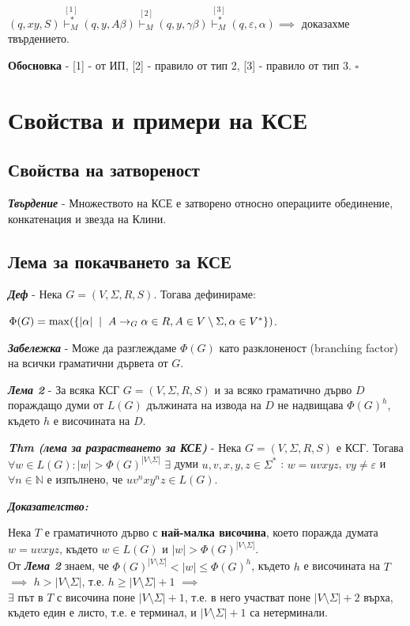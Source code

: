 \documentclass[fleqn,12pt]{article}
\DeclareMathOperator{\mmax}{max}
\begin{document}
\begin{flushleft}
$(q, xy, S) \overset{[1]}{\vdash_M^*} (q, y, A\beta) \overset{[2]}{\vdash_M} (q, y, \gamma\beta) \overset{[3]}{\vdash_M^*} (q, \varepsilon, \alpha) \implies$ доказахме твърдението.

\textbf{Обосновка} - [1] - от ИП, [2] - правило от тип 2, [3] - правило от тип 3. $\square$

\section{Свойства и примери на КСЕ}

\subsection{Свойства на затвореност}

\textit{\textbf{Твърдение}} - Множеството на КСЕ е затворено относно операциите обединение, конкатенация и звезда на Клини.

\subsection{Лема за покачването за КСЕ}

\textit{\textbf{Деф}} - Нека $G = (V, \Sigma, R, S)$. Тогава дефинираме: 

$\Phi(G) = \mmax(\{|\alpha| \hspace{2mm} | \hspace{2mm} A \to_G \alpha \in R, A \in V \setminus \Sigma, \alpha \in V^*\})$.

\textit{\textbf{Забележка}} - Може да разглеждаме $\Phi(G)$ като разклоненост (branching factor) на всички граматични дървета от $G$.

\textit{\textbf{Лема 2}} - За всяка КСГ $G = (V, \Sigma, R, S)$ и за всяко граматично дърво $D$ пораждащо думи от $L(G)$ дължината на извода на $D$ не надвищава $\Phi(G)^h$, където $h$ е височината на $D$.

\textit{\textbf{Thm (лема за разрастването за КСЕ)}} - Нека $G = (V, \Sigma, R, S)$ е КСГ. 
Тогава $\forall w \in L(G): |w| > \Phi(G)^{|V \setminus \Sigma|}$  $\exists$ думи $u, v, x, y, z \in \Sigma^*$ : $w=uvxyz$, $vy \neq \varepsilon$ и $\forall n \in \mathbb{N}$ е изпълнено, че $uv^nxy^nz \in L(G)$.

\textit{\textbf{Доказателство:}}

Нека $T$ е граматичното дърво с \textbf{най-малка височина}, което поражда думата $w = uvxyz$, където $w \in L(G)$ и $|w| > \Phi(G)^{|V \setminus \Sigma|}$. \\
От \textit{\textbf{Лема 2}} знаем, че $\Phi(G)^{|V \setminus \Sigma|} < |w| \leq \Phi(G)^h$, където $h$ е височината на $T$ $\implies$ $h > |V \setminus \Sigma|$, т.е. $h \geq |V \setminus \Sigma| + 1$ $\implies$ \\
$\exists$ път в $T$ с височина поне $|V \setminus \Sigma| + 1$, т.е. в него участват поне $|V \setminus \Sigma| + 2$ върха, където един е листо, т.е. е терминал, и $|V \setminus \Sigma| + 1$ са нетерминали.


\end{flushleft}
\end{document}
